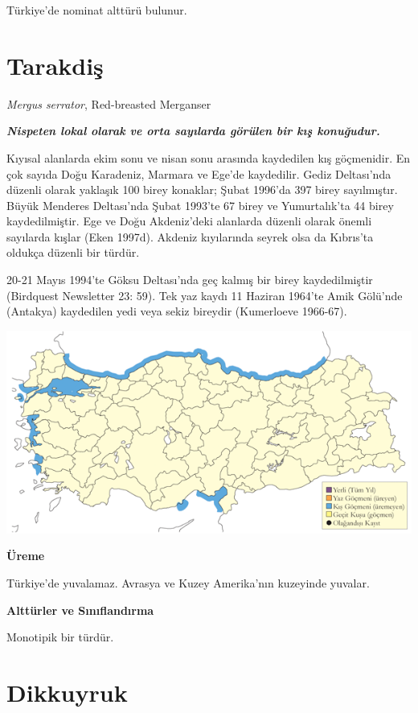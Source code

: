 \documentclass[
  letterpaper,
  DIV=11,
  numbers=noendperiod]{scrreprt}
\begin{document}
Türkiye'de nominat alttürü bulunur.

\section{Tarakdiş}\label{tarakdiux15f}

\emph{Mergus serrator}, Red-breasted Merganser

\textbf{\emph{Nispeten lokal olarak ve orta sayılarda görülen bir kış
konuğudur.}}

Kıyısal alanlarda ekim sonu ve nisan sonu arasında kaydedilen kış
göçmenidir. En çok sayıda Doğu Karadeniz, Marmara ve Ege'de kaydedilir.
Gediz Deltası'nda düzenli olarak yaklaşık 100 birey konaklar; Şubat
1996'da 397 birey sayılmıştır. Büyük Menderes Deltası'nda Şubat 1993'te
67 birey ve Yumurtalık'ta 44 birey kaydedilmiştir. Ege ve Doğu
Akdeniz'deki alanlarda düzenli olarak önemli sayılarda kışlar (Eken
1997d). Akdeniz kıyılarında seyrek olsa da Kıbrıs'ta oldukça düzenli bir
türdür.

20-21 Mayıs 1994'te Göksu Deltası'nda geç kalmış bir birey
kaydedilmiştir (Birdquest Newsletter 23: 59). Tek yaz kaydı 11 Haziran
1964'te Amik Gölü'nde (Antakya) kaydedilen yedi veya sekiz bireydir
(Kumerloeve 1966-67).

\includegraphics{images/harita_Page_034.png}

\textbf{Üreme}

Türkiye'de yuvalamaz. Avrasya ve Kuzey Amerika'nın kuzeyinde yuvalar.

\textbf{Alttürler ve Sınıflandırma}

Monotipik bir türdür.

\section{Dikkuyruk}\label{dikkuyruk}
\end{document}
